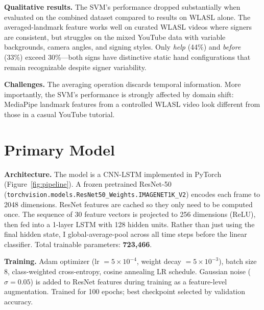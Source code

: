 \documentclass[final]{article}
\begin{document}
\begin{table}[h]
  \centering
  \caption{SVM baseline per-class test accuracy (\%) on the 100-example test set.}
  \label{tab:baseline_acc}
\end{table}

\textbf{Qualitative results.}
The SVM's performance dropped substantially when evaluated on the combined
dataset compared to results on WLASL alone. The averaged-landmark feature works
well on curated WLASL videos where signers are consistent, but struggles on the
mixed YouTube data with variable backgrounds, camera angles, and signing styles.
Only \textit{help} (44\%) and \textit{before} (33\%) exceed 30\%---both signs
have distinctive static hand configurations that remain recognizable despite
signer variability.

\textbf{Challenges.}
The averaging operation discards temporal information. More importantly, the
SVM's performance is strongly affected by domain shift: MediaPipe landmark
features from a controlled WLASL video look different from those in a casual
YouTube tutorial.

\section*{Primary Model}

\textbf{Architecture.}
The model is a CNN-LSTM implemented in PyTorch
(Figure~\ref{fig:pipeline}). A frozen pretrained ResNet-50
(\texttt{torchvision.models.ResNet50\_Weights.IMAGENET1K\_V2}) encodes each
frame to 2048 dimensions. ResNet features are cached so they only need to be
computed once. The sequence of 30 feature vectors is projected to 256 dimensions
(ReLU), then fed into a 1-layer LSTM with 128 hidden units. Rather than just
using the final hidden state, I global-average-pool across all time steps before
the linear classifier. Total trainable parameters: \textbf{723,466}.

\textbf{Training.}
Adam optimizer (lr $= 5\times10^{-4}$, weight decay $= 5\times10^{-3}$),
batch size 8, class-weighted cross-entropy, cosine annealing LR schedule.
Gaussian noise ($\sigma = 0.05$) is added to ResNet features during training
as a feature-level augmentation. Trained for 100 epochs; best checkpoint
selected by validation accuracy.
\end{document}
